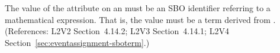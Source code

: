 The value of the  attribute on an \EventAssignment must be an
SBO identifier referring to a mathematical expression.  That is, the value
must be a term derived from \sbomathformula.  (References: L2V2 Section~4.14.2;
L2V3 Section~4.14.1; L2V4 Section~\ref{sec:eventassignment-sboterm}.)
